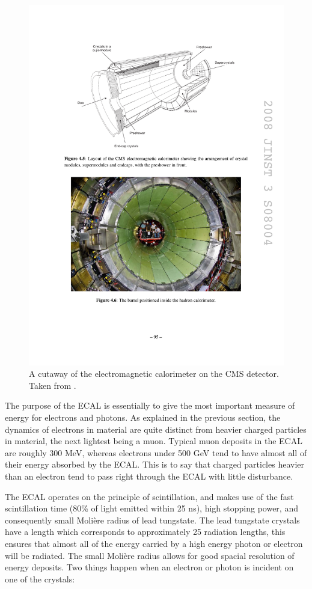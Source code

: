     \begin{figure}[h!]
      \centering
      \includegraphics[width=.9\textwidth]{figures/cms_ecal.pdf}
      \caption{A cutaway of the electromagnetic calorimeter on the CMS detector. Taken from \cite{cms_jinst}.}
      \label{fig:ecal_cutaway}
    \end{figure}

    The purpose of the ECAL is essentially to give the most important measure of energy for electrons and photons. As explained in the previous section, the dynamics of electrons in material are quite distinct from heavier charged particles in material, the next lightest being a muon. Typical muon deposits in the ECAL are roughly 300 MeV\cite{muon_stopping_power}, whereas electrons under 500 GeV tend to have almost all of their energy absorbed by the ECAL\cite[sec. 4.10]{cms_jinst}. This is to say that charged particles heavier than an electron tend to pass right through the ECAL with little disturbance. 

    The ECAL operates on the principle of scintillation\cite[ch. 7]{leo_detectors}, and makes use of the fast scintillation time (80\% of light emitted within 25 ns), high stopping power, and consequently small Moli\`ere radius of lead tungstate. The lead tungstate crystals have a length which corresponds to approximately 25 radiation lengths, this ensures that almost all of the energy carried by a high energy photon or electron will be radiated. The small Moli\`ere radius allows for good spacial resolution of energy deposits. \cite[pg. 90]{cms_jinst} Two things happen when an electron or photon is incident on one of the crystals:

